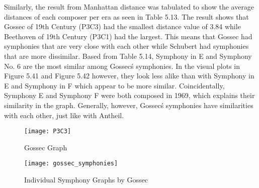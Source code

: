 Similarly, the result from Manhattan distance was tabulated to show the average distances of each composer per era as seen in Table 5.13. The result shows that Gossec of 19th Century  (P3C3) had the smallest distance value of 3.84 while Beethoven of 19th Century (P3C1) had the largest. This means that Gossec had symphonies that are very close with each other while Schubert had symphonies that are more dissimilar. Based from Table 5.14, Symphony in E and Symphony No. 6 are the most similar among Gossec\'s symphonies. In the visual plots in Figure 5.41 and Figure 5.42 however, they look less alike than with Symphony in E and Symphony in F which appear to be more similar. Coincidentally, Symphony E and Symphony F were both composed in 1969, which explains their similarity in the graph. Generally, however, Gossec\'s symphonies have similarities with each other, just like with Antheil.

\begin{figure}[H]
\caption{Gossec Graph}
\centering
\texttt{[image: P3C3]}
\end{figure}

\begin{figure}[H]
\caption{Individual Symphony Graphs by Gossec}
\centering
\texttt{[image: gossec\_symphonies]}
\end{figure}

